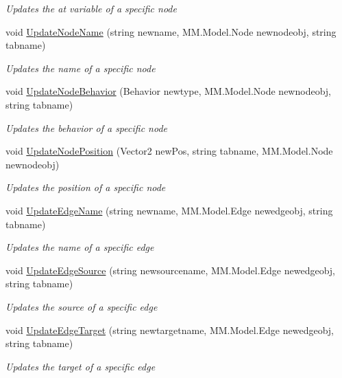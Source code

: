 \begin{DoxyCompactItemize}
\begin{DoxyCompactList}\small\item\em Updates the at variable of a specific node \end{DoxyCompactList}\item 
void \hyperlink{class_model_controller_a2bc7d852f482d7190094602734029097}{Update\+Node\+Name} (string newname, M\+M.\+Model.\+Node newnodeobj, string tabname)
\begin{DoxyCompactList}\small\item\em Updates the name of a specific node \end{DoxyCompactList}\item 
void \hyperlink{class_model_controller_a5b2ce36e6894c3e41f42b4f9dc0d9b06}{Update\+Node\+Behavior} (Behavior newtype, M\+M.\+Model.\+Node newnodeobj, string tabname)
\begin{DoxyCompactList}\small\item\em Updates the behavior of a specific node \end{DoxyCompactList}\item 
void \hyperlink{class_model_controller_a184dc2424e87afbec8dc12e99f2f2451}{Update\+Node\+Position} (Vector2 new\+Pos, string tabname, M\+M.\+Model.\+Node newnodeobj)
\begin{DoxyCompactList}\small\item\em Updates the position of a specific node \end{DoxyCompactList}\item 
void \hyperlink{class_model_controller_ae55705c9c541f326757e2a4ba0310af0}{Update\+Edge\+Name} (string newname, M\+M.\+Model.\+Edge newedgeobj, string tabname)
\begin{DoxyCompactList}\small\item\em Updates the name of a specific edge \end{DoxyCompactList}\item 
void \hyperlink{class_model_controller_aaa7910a28a9feb7e6086cec6aba33613}{Update\+Edge\+Source} (string newsourcename, M\+M.\+Model.\+Edge newedgeobj, string tabname)
\begin{DoxyCompactList}\small\item\em Updates the source of a specific edge \end{DoxyCompactList}\item 
void \hyperlink{class_model_controller_afc082aa500c60243108b67e509d62ef2}{Update\+Edge\+Target} (string newtargetname, M\+M.\+Model.\+Edge newedgeobj, string tabname)
\begin{DoxyCompactList}\small\item\em Updates the target of a specific edge \end{DoxyCompactList}\item 

\end{DoxyCompactItemize}
